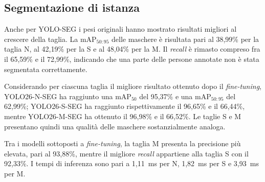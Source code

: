\begin{table}[htbp]
    \centering
    \caption[Prestazioni dei modelli YOLO26 Detection]{Risultati dei modelli YOLO26 Detection sul \textit{test set}}
    \label{tab:yolo26-risultati-detection}
    \footnotesize
    \renewcommand{\arraystretch}{1.15}
\end{table}

\subsection{Segmentazione di istanza}

Anche per YOLO-SEG i pesi originali hanno mostrato risultati migliori al crescere della taglia. La $\mathrm{mAP}_{50:95}$ delle maschere è risultata pari al 38{,}99\% per la taglia N, al 42{,}19\% per la S e al 48{,}04\% per la M. Il \textit{recall} è rimasto compreso fra il 65{,}59\% e il 72{,}99\%, indicando che una parte delle persone annotate non è stata segmentata correttamente.

Considerando per ciascuna taglia il migliore risultato ottenuto dopo il \textit{fine-tuning}, YOLO26-N-SEG ha raggiunto una $\mathrm{mAP}_{50}$ del 95{,}37\% e una $\mathrm{mAP}_{50:95}$ del 62{,}99\%; YOLO26-S-SEG ha raggiunto rispettivamente il 96{,}65\% e il 66{,}44\%, mentre YOLO26-M-SEG ha ottenuto il 96{,}98\% e il 66{,}52\%. Le taglie S e M presentano quindi una qualità delle maschere sostanzialmente analoga.

Tra i modelli sottoposti a \textit{fine-tuning}, la taglia M presenta la precisione più elevata, pari al 93{,}88\%, mentre il migliore \textit{recall} appartiene alla taglia S con il 92{,}33\%. I tempi di inferenza sono pari a 1{,}11~ms per N, 1{,}82~ms per S e 3{,}93~ms per M.

